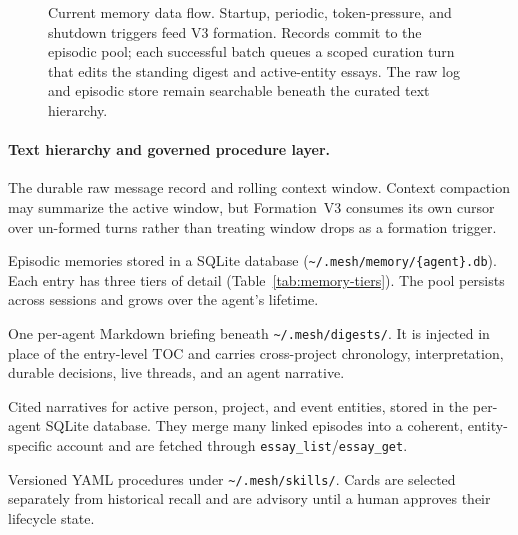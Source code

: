 \documentclass[11pt,letterpaper]{report}
\newcommand{\code}[1]{\texttt{#1}}
\begin{document}
\begin{figure}[h]
\begin{tikzpicture}
\end{tikzpicture}
\caption{Current memory data flow. Startup, periodic, token-pressure, and
shutdown triggers feed V3 formation. Records commit to the episodic pool;
each successful batch queues a scoped curation turn that edits the standing
digest and active-entity essays. The raw log and episodic store remain
searchable beneath the curated text hierarchy.}
\label{fig:memory}
\end{figure}

\paragraph{Text hierarchy and governed procedure layer.}
\begin{description}[nosep, leftmargin=1.5em]
  \item[Conversation history] The durable raw message record and rolling
    context window. Context compaction may summarize the active window, but
    Formation~V3 consumes its own cursor over un-formed turns rather than
    treating window drops as a formation trigger.
  \item[Memory pool] Episodic memories stored in a SQLite database
    (\code{\textasciitilde/.mesh/memory/\{agent\}.db}). Each entry has
    three tiers of detail (Table~\ref{tab:memory-tiers}). The pool
    persists across sessions and grows over the agent's lifetime.
  \item[Standing digest] One per-agent Markdown briefing beneath
    \code{\textasciitilde/.mesh/digests/}. It is injected in place of the
    entry-level TOC and carries cross-project chronology, interpretation,
    durable decisions, live threads, and an agent narrative.
  \item[Entity essays] Cited narratives for active person, project, and
    event entities, stored in the per-agent SQLite database. They merge many
    linked episodes into a coherent, entity-specific account and are fetched
    through \code{essay\_list}/\code{essay\_get}.
  \item[Skill cards] Versioned YAML procedures under
    \code{\textasciitilde/.mesh/skills/}. Cards are selected separately from
    historical recall and are advisory until a human approves their lifecycle
    state.
\end{description}
\end{document}

